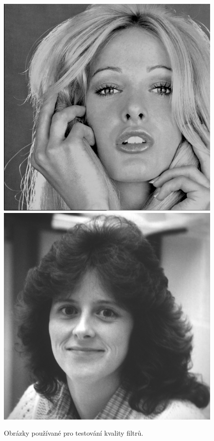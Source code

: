 \begin{figure}[h!]
    \includegraphics[width=\size]{fig/testimages/woman_blonde.png}\hfill
    \includegraphics[width=\size]{fig/testimages/woman_darkhair.png}
    \caption{Obrázky používané pro testování kvality filtrů.}
    \label{obrTestovaci}
\end{figure}

